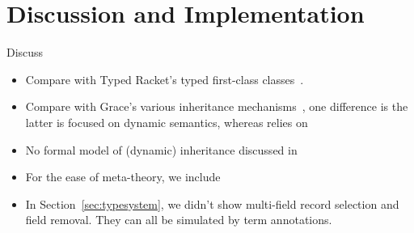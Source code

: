 
\section{Discussion and Implementation}
\label{sec:discuss}

Discuss

\begin{itemize}
\item Compare  with Typed Racket's typed first-class
  classes~\cite{DBLP:conf/oopsla/TakikawaSDTF12}.
\item Compare with Grace's various inheritance mechanisms~\cite{DBLP:conf/ecoop/0002HNB16}, one
  difference is the latter is focused on dynamic semantics, whereas \name
  relies on \bname
\item No formal model of (dynamic) inheritance discussed in \cite{DBLP:journals/jot/NobleBBHJ17}
\item For the ease of meta-theory, we include 
\item In Section~\ref{sec:typesystem}, we didn't show multi-field record
  selection and field removal. They can all be simulated by term annotations.
\end{itemize}
